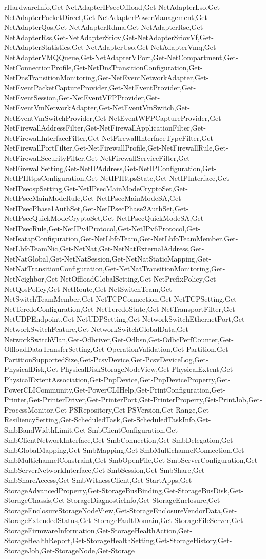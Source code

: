 {{rHardwareInfo,Get-NetAdapterIPsecOffload,Get-NetAdapterLso,Get-NetAdapterPacketDirect,Get-NetAdapterPowerManagement,Get-NetAdapterQos,Get-NetAdapterRdma,Get-NetAdapterRsc,Get-NetAdapterRss,Get-NetAdapterSriov,Get-NetAdapterSriovVf,Get-NetAdapterStatistics,Get-NetAdapterUso,Get-NetAdapterVmq,Get-NetAdapterVMQQueue,Get-NetAdapterVPort,Get-NetCompartment,Get-NetConnectionProfile,Get-NetDnsTransitionConfiguration,Get-NetDnsTransitionMonitoring,Get-NetEventNetworkAdapter,Get-NetEventPacketCaptureProvider,Get-NetEventProvider,Get-NetEventSession,Get-NetEventVFPProvider,Get-NetEventVmNetworkAdapter,Get-NetEventVmSwitch,Get-NetEventVmSwitchProvider,Get-NetEventWFPCaptureProvider,Get-NetFirewallAddressFilter,Get-NetFirewallApplicationFilter,Get-NetFirewallInterfaceFilter,Get-NetFirewallInterfaceTypeFilter,Get-NetFirewallPortFilter,Get-NetFirewallProfile,Get-NetFirewallRule,Get-NetFirewallSecurityFilter,Get-NetFirewallServiceFilter,Get-NetFirewallSetting,Get-NetIPAddress,Get-NetIPConfiguration,Get-NetIPHttpsConfiguration,Get-NetIPHttpsState,Get-NetIPInterface,Get-NetIPseospSetting,Get-NetIPsecMainModeCryptoSet,Get-NetIPsecMainModeRule,Get-NetIPsecMainModeSA,Get-NetIPsecPhase1AuthSet,Get-NetIPsecPhase2AuthSet,Get-NetIPsecQuickModeCryptoSet,Get-NetIPsecQuickModeSA,Get-NetIPsecRule,Get-NetIPv4Protocol,Get-NetIPv6Protocol,Get-NetIsatapConfiguration,Get-NetLbfoTeam,Get-NetLbfoTeamMember,Get-NetLbfoTeamNic,Get-NetNat,Get-NetNatExternalAddress,Get-NetNatGlobal,Get-NetNatSession,Get-NetNatStaticMapping,Get-NetNatTransitionConfiguration,Get-NetNatTransitionMonitoring,Get-NetNeighbor,Get-NetOffloadGlobalSetting,Get-NetPrefixPolicy,Get-NetQosPolicy,Get-NetRoute,Get-NetSwitchTeam,Get-NetSwitchTeamMember,Get-NetTCPConnection,Get-NetTCPSetting,Get-NetTeredoConfiguration,Get-NetTeredoState,Get-NetTransportFilter,Get-NetUDPEndpoint,Get-NetUDPSetting,Get-NetworkSwitchEthernetPort,Get-NetworkSwitchFeature,Get-NetworkSwitchGlobalData,Get-NetworkSwitchVlan,Get-Odbriver,Get-Odbsn,Get-OdbcPerfCounter,Get-OffloadDataTransferSetting,Get-OperationValidation,Get-Partition,Get-PartitionSupportedSize,Get-PcsvDevice,Get-PcsvDeviceLog,Get-PhysicalDisk,Get-PhysicalDiskStorageNodeView,Get-PhysicalExtent,Get-PhysicalExtentAssociation,Get-PnpDevice,Get-PnpDeviceProperty,Get-PowerCLICommunity,Get-PowerCLIHelp,Get-PrintConfiguration,Get-Printer,Get-PrinterDriver,Get-PrinterPort,Get-PrinterProperty,Get-PrintJob,Get-ProcessMonitor,Get-PSRepository,Get-PSVersion,Get-Range,Get-ResiliencySetting,Get-ScheduledTask,Get-ScheduledTaskInfo,Get-SmbBandWidthLimit,Get-SmbClientConfiguration,Get-SmbClientNetworkInterface,Get-SmbConnection,Get-SmbDelegation,Get-SmbGlobalMapping,Get-SmbMapping,Get-SmbMultichannelConnection,Get-SmbMultichannelConstraint,Get-SmbOpenFile,Get-SmbServerConfiguration,Get-SmbServerNetworkInterface,Get-SmbSession,Get-SmbShare,Get-SmbShareAccess,Get-SmbWitnessClient,Get-StartApps,Get-StorageAdvancedProperty,Get-StorageBusBinding,Get-StorageBusDisk,Get-StorageChassis,Get-StorageDiagnosticInfo,Get-StorageEnclosure,Get-StorageEnclosureStorageNodeView,Get-StorageEnclosureVendorData,Get-StorageExtendedStatus,Get-StorageFaultDomain,Get-StorageFileServer,Get-StorageFirmwareInformation,Get-StorageHealthAction,Get-StorageHealthReport,Get-StorageHealthSetting,Get-StorageHistory,Get-StorageJob,Get-StorageNode,Get-Storage}}
